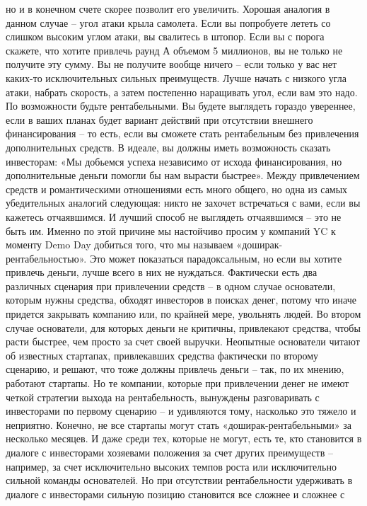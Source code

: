 \documentclass[ebook,12pt,oneside,openany]{memoir}
\begin{document}
но и в конечном счете скорее позволит его увеличить. Хорошая аналогия
в данном случае – угол атаки крыла самолета. Если вы попробуете лететь
со слишком высоким углом атаки, вы свалитесь в штопор. Если вы с
порога скажете, что хотите привлечь раунд А объемом 5 миллионов, вы не
только не получите эту сумму. Вы не получите вообще ничего – если
только у вас нет каких-то исключительных сильных преимуществ. Лучше
начать с низкого угла атаки, набрать скорость, а затем постепенно
наращивать угол, если вам это надо. По возможности будьте
рентабельными. Вы будете выглядеть гораздо увереннее, если в ваших
планах будет вариант действий при отсутствии внешнего финансирования –
то есть, если вы сможете стать рентабельным без привлечения
дополнительных средств. В идеале, вы должны иметь возможность сказать
инвесторам: «Мы добьемся успеха независимо от исхода финансирования,
но дополнительные деньги помогли бы нам вырасти быстрее». Между
привлечением средств и романтическими отношениями есть много общего,
но одна из самых убедительных аналогий следующая: никто не захочет
встречаться с вами, если вы кажетесь отчаявшимся. И лучший способ не
выглядеть отчаявшимся – это не быть им. Именно по этой причине мы
настойчиво просим у компаний YC к моменту Demo Day добиться того, что
мы называем «доширак-рентабельностью». Это может показаться
парадоксальным, но если вы хотите привлечь деньги, лучше всего в них
не нуждаться. Фактически есть два различных сценария при привлечении
средств – в одном случае основатели, которым нужны средства, обходят
инвесторов в поисках денег, потому что иначе придется закрывать
компанию или, по крайней мере, увольнять людей. Во втором случае
основатели, для которых деньги не критичны, привлекают средства, чтобы
расти быстрее, чем просто за счет своей выручки. Неопытные основатели
читают об известных стартапах, привлекавших средства фактически по
второму сценарию, и решают, что тоже должны привлечь деньги – так, по
их мнению, работают стартапы. Но те компании, которые при привлечении
денег не имеют четкой стратегии выхода на рентабельность, вынуждены
разговаривать с инвесторами по первому сценарию – и удивляются тому,
насколько это тяжело и неприятно. Конечно, не все стартапы могут стать
«доширак-рентабельными» за несколько месяцев. И даже среди тех,
которые не могут, есть те, кто становится в диалоге с инвесторами
хозяевами положения за счет других преимуществ – например, за счет
исключительно высоких темпов роста или исключительно сильной команды
основателей. Но при отсутствии рентабельности удерживать в диалоге с
инвесторами сильную позицию становится все сложнее и сложнее с
\end{document}
